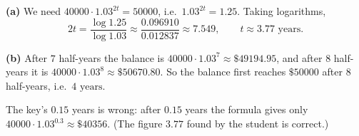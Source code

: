 \textbf{(a)} We need $40000\cdot1.03^{2t}=50000$, i.e.\ $1.03^{2t}=1.25$. Taking logarithms,
\[
2t=\dfrac{\log1.25}{\log1.03}\approx\dfrac{0.096910}{0.012837}\approx7.549,\qquad t\approx\boxed{3.77\text{ years}}.
\]

\textbf{(b)} After $7$ half-years the balance is $40000\cdot1.03^7\approx\$49194.95$, and after $8$ half-years it is $40000\cdot1.03^8\approx\$50670.80$. So the balance first reaches $\$50000$ after $8$ half-years, i.e.\ $\boxed{4\text{ years}}$.

The key's $0.15$ years is wrong: after $0.15$ years the formula gives only $40000\cdot1.03^{0.3}\approx\$40356$. (The figure $3.77$ found by the student is correct.)
